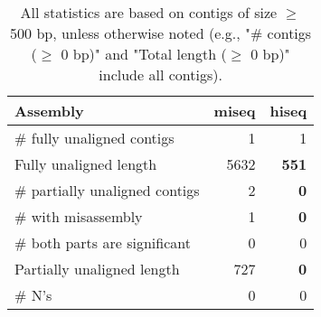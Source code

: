 \documentclass[12pt,a4paper]{article}
\begin{document}
\begin{table}[ht]
\begin{center}
\caption{All statistics are based on contigs of size $\geq$ 500 bp, unless otherwise noted (e.g., "\# contigs ($\geq$ 0 bp)" and "Total length ($\geq$ 0 bp)" include all contigs).}
\begin{tabular}{|l*{2}{|r}|}
\hline
Assembly & miseq & hiseq \\ \hline
\# fully unaligned contigs & 1 & 1 \\ \hline
Fully unaligned length & 5632 & {\bf 551} \\ \hline
\# partially unaligned contigs & 2 & {\bf 0} \\ \hline
\hspace{5mm}\# with misassembly & 1 & {\bf 0} \\ \hline
\hspace{5mm}\# both parts are significant & 0 & 0 \\ \hline
Partially unaligned length & 727 & {\bf 0} \\ \hline
\# N's & 0 & 0 \\ \hline
\end{tabular}
\end{center}
\end{table}
\end{document}
